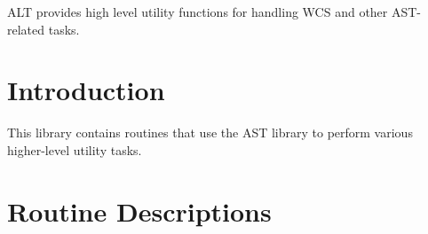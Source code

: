 
ALT provides high level utility functions for handling WCS and other
AST-related tasks.

 \newpage
 \begin{latexonly}
   \setlength{\parskip}{0mm}
   \latexonlytoc
   \setlength{\parskip}{\medskipamount}
   \markright{\stardocname}
 \end{latexonly}
\newpage
\renewcommand{\thepage}{\arabic{page}}
\setcounter{page}{1}

\section {Introduction}

This library contains routines that use the AST library to perform various 
higher-level utility tasks.

\appendix
\section{\label{APP:SPEC}Routine Descriptions}

